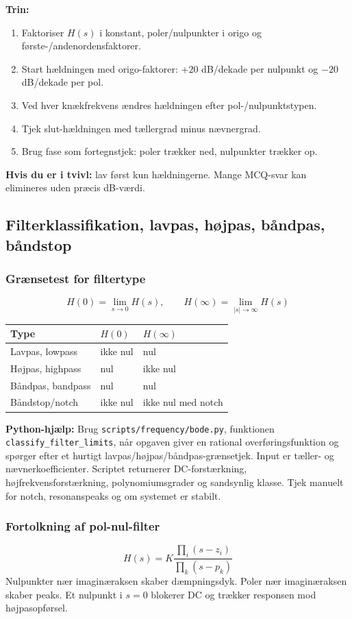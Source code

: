 \textbf{Trin:}
\begin{enumerate}
    \item Faktoriser \(H(s)\) i konstant, poler/nulpunkter i origo og første-/andenordensfaktorer.
    \item Start hældningen med origo-faktorer: \(+20\) dB/dekade per nulpunkt og \(-20\) dB/dekade per pol.
    \item Ved hver knækfrekvens ændres hældningen efter pol-/nulpunktstypen.
    \item Tjek slut-hældningen med tællergrad minus nævnergrad.
    \item Brug fase som fortegnstjek: poler trækker ned, nulpunkter trækker op.
\end{enumerate}

\textbf{Hvis du er i tvivl:} lav først kun hældningerne. Mange MCQ-svar kan elimineres uden præcis dB-værdi.

\subsection{Filterklassifikation, lavpas, højpas, båndpas, båndstop}

\subsubsection{Grænsetest for filtertype}
\[
H(0)=\lim_{s\to0}H(s),\qquad
H(\infty)=\lim_{|s|\to\infty}H(s)
\]
\begin{tabular}{lll}
\toprule
Type & \(H(0)\) & \(H(\infty)\) \\
\midrule
Lavpas, lowpass & ikke nul & nul \\
Højpas, highpass & nul & ikke nul \\
Båndpas, bandpass & nul & nul \\
Båndstop/notch & ikke nul & ikke nul med notch \\
\bottomrule
\end{tabular}

\textbf{Python-hjælp:} Brug \texttt{scripts/frequency/bode.py}, funktionen \texttt{classify\_filter\_limits}, når opgaven giver en rational overføringsfunktion og spørger efter et hurtigt lavpas/højpas/båndpas-grænsetjek. Input er tæller- og nævnerkoefficienter. Scriptet returnerer DC-forstærkning, højfrekvensforstærkning, polynomiumsgrader og sandsynlig klasse. Tjek manuelt for notch, resonanspeaks og om systemet er stabilt.

\subsubsection{Fortolkning af pol-nul-filter}
\[
H(s)=K\frac{\prod_i(s-z_i)}{\prod_k(s-p_k)}
\]
Nulpunkter nær imaginæraksen skaber dæmpningsdyk. Poler nær imaginæraksen skaber peaks. Et nulpunkt i \(s=0\) blokerer DC og trækker responsen mod højpasopførsel.

